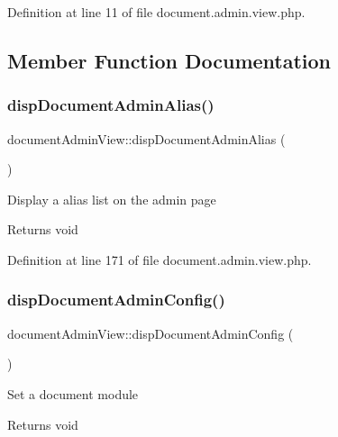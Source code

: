 Definition at line 11 of file document.\+admin.\+view.\+php.



\subsection{Member Function Documentation}
\mbox{\label{classdocumentAdminView_a7f9210670150395b7ef8c6209ce0ac53}} 
\subsubsection{\texorpdfstring{disp\+Document\+Admin\+Alias()}{dispDocumentAdminAlias()}}
{\footnotesize\ttfamily document\+Admin\+View\+::disp\+Document\+Admin\+Alias (\begin{DoxyParamCaption}{ }\end{DoxyParamCaption})}

Display a alias list on the admin page \begin{DoxyReturn}{Returns}
void 
\end{DoxyReturn}


Definition at line 171 of file document.\+admin.\+view.\+php.

\mbox{\label{classdocumentAdminView_a4b41049c99341fbb4a782da55d3737e5}} 
\subsubsection{\texorpdfstring{disp\+Document\+Admin\+Config()}{dispDocumentAdminConfig()}}
{\footnotesize\ttfamily document\+Admin\+View\+::disp\+Document\+Admin\+Config (\begin{DoxyParamCaption}{ }\end{DoxyParamCaption})}

Set a document module \begin{DoxyReturn}{Returns}
void 
\end{DoxyReturn}


